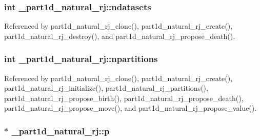 \subsubsection[{\texorpdfstring{ndatasets}{ndatasets}}]{\setlength{\rightskip}{0pt plus 5cm}int \+\_\+part1d\+\_\+natural\+\_\+rj\+::ndatasets}\hypertarget{struct__part1d__natural__rj_acae391f3796a41637af945a56533254b}{}\label{struct__part1d__natural__rj_acae391f3796a41637af945a56533254b}


Referenced by part1d\+\_\+natural\+\_\+rj\+\_\+clone(), part1d\+\_\+natural\+\_\+rj\+\_\+create(), part1d\+\_\+natural\+\_\+rj\+\_\+destroy(), and part1d\+\_\+natural\+\_\+rj\+\_\+propose\+\_\+death().

\subsubsection[{\texorpdfstring{npartitions}{npartitions}}]{\setlength{\rightskip}{0pt plus 5cm}int \+\_\+part1d\+\_\+natural\+\_\+rj\+::npartitions}\hypertarget{struct__part1d__natural__rj_a15524ba9fc8ce1ed63a752e437723feb}{}\label{struct__part1d__natural__rj_a15524ba9fc8ce1ed63a752e437723feb}


Referenced by part1d\+\_\+natural\+\_\+rj\+\_\+clone(), part1d\+\_\+natural\+\_\+rj\+\_\+create(), part1d\+\_\+natural\+\_\+rj\+\_\+initialize(), part1d\+\_\+natural\+\_\+rj\+\_\+partitions(), part1d\+\_\+natural\+\_\+rj\+\_\+propose\+\_\+birth(), part1d\+\_\+natural\+\_\+rj\+\_\+propose\+\_\+death(), part1d\+\_\+natural\+\_\+rj\+\_\+propose\+\_\+move(), and part1d\+\_\+natural\+\_\+rj\+\_\+propose\+\_\+value().

\subsubsection[{\texorpdfstring{p}{p}}]{$\ast$ \+\_\+part1d\+\_\+natural\+\_\+rj\+::p}\hypertarget{struct__part1d__natural__rj_a51b2e7594b812e17cc93d392b4490cf4}{}\label{struct__part1d__natural__rj_a51b2e7594b812e17cc93d392b4490cf4}


